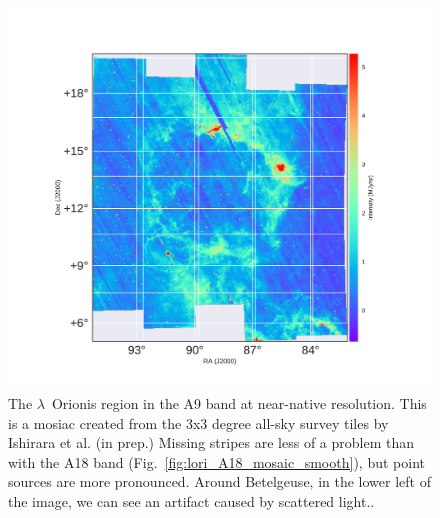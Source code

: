             \begin{figure}
              \includegraphics[width=\textwidth,trim={2.5cm 2cm 3.0cm 2cm},clip]{../Plots/ch_lori/lori_A9_mosaic_smooth.pdf}
              \centering
              \caption{The $\lambda$~Orionis region in the A9 band at near-native resolution. This is a mosiac created from the 3x3 degree all-sky survey tiles by Ishirara et al. (in prep.) Missing stripes are less of a problem than with the A18 band (Fig.~\ref{fig:lori_A18_mosaic_smooth}), but point sources are more pronounced. Around Betelgeuse, in the lower left of the image, we can see an artifact caused by scattered light.. }
              \label{fig:lori_A9_mosaic_smooth}
            \end{figure}
